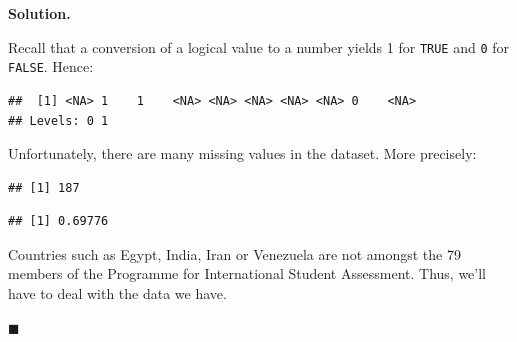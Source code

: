 \documentclass[10pt,b5paper,krantz1]{krantz}
\newenvironment{Shaded}{\begin{snugshade}}{\end{snugshade}}
\newcommand{\CommentTok}[1]{\textcolor[rgb]{0.37,0.37,0.37}{\textit{#1}}}
\newcommand{\DecValTok}[1]{\textcolor[rgb]{0.06,0.06,0.06}{#1}}
\newcommand{\KeywordTok}[1]{\textcolor[rgb]{0.27,0.27,0.27}{\textbf{#1}}}
\newcommand{\NormalTok}[1]{#1}
\newcommand{\OperatorTok}[1]{\textcolor[rgb]{0.43,0.43,0.43}{\textbf{#1}}}
\newcommand{\StringTok}[1]{\textcolor[rgb]{0.5,0.5,0.5}{#1}}
\newenvironment{solution}{%
\bigskip\noindent\textbf{Solution. }%
\it\ignorespaces%
\ignorespaces%
}{\ignorespaces%
\hfill$\blacksquare$%
}
\begin{document}
\begin{solution}

Recall that a conversion of a logical value to a number
yields 1 for \texttt{TRUE} and \texttt{0} for \texttt{FALSE}. Hence:

\begin{Shaded}
\end{Shaded}

\begin{verbatim}
##  [1] <NA> 1    1    <NA> <NA> <NA> <NA> <NA> 0    <NA>
## Levels: 0 1
\end{verbatim}

Unfortunately, there are many missing values in the dataset.
More precisely:

\begin{Shaded}
\end{Shaded}

\begin{verbatim}
## [1] 187
\end{verbatim}

\begin{Shaded}
\end{Shaded}

\begin{verbatim}
## [1] 0.69776
\end{verbatim}

Countries such as Egypt, India, Iran or Venezuela
are not amongst the 79 members of the Programme for International
Student Assessment. Thus, we'll have to deal with the data we have.


\end{solution}
\end{document}
